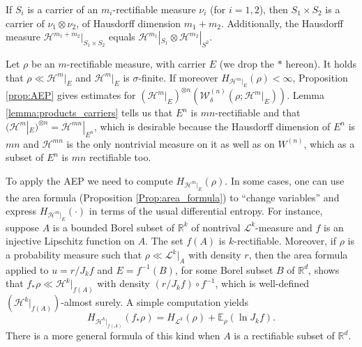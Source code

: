 \documentclass[runningheads]{llncs}
\newcommand{\Exx}[2]{\mathbb{E}_{#1}\left(#2\right)}
\newcommand{\Rr}{\mathbb{R}}
\begin{document}
\begin{lemma}\label{lemma:products_carriers}
If $S_i$ is a carrier of an $m_i$-rectifiable measure $\nu_i$ (for $i=1,2$), then $S_1\times S_2$ is  a carrier of $\nu_1\otimes\nu_2$, of Hausdorff dimension $m_1+m_2$. 
Additionally, the Hausdorff measure $\mathcal H^{m_1+m_2}|_{S_1\times S_2}$ equals $\mathcal H^{m_1}|_{S_1} \otimes \mathcal H^{m_2}|_{S^2}$. 
\end{lemma}

Let $\rho$ be an $m$-rectifiable measure, with carrier $E$ (we drop the $*$ hereon). It holds that $\rho \ll\mathcal H^m|_{E}$ and $\mathcal H^m|_E$ is $\sigma$-finite. If moreover $H_{\mathcal H^m|_{E}}(\rho)<\infty$,  Proposition \ref{prop:AEP} gives estimates for  $(\mathcal H^{m}|_E)^{\otimes n}(\mathcal  W^{(n)}_\delta (\rho; \mathcal H^m|_{E}))$. Lemma \ref{lemma:products_carriers} tells us that $E^n$ is $mn$-rectifiable and that $(\mathcal H^{m}|_E)^{\otimes n} = \mathcal H^{mn}|_{E^n}$, which is desirable because the Hausdorff dimension of $E^n$ is $mn$ and $\mathcal H^{mn}$ is the only nontrivial measure on it as well as on $W^{(n)}$, which as a subset of $E^n$ is $mn$ rectifiable too.

To apply the AEP we need to compute $H_{\mathcal H^m|_{E}}(\rho)$. In some cases, one can use the area formula (Proposition \ref{Prop:area_formula}) to ``change variables'' and express $H_{\mathcal H^m|_{E}}(\cdot)$ in terms of the usual differential entropy. For instance, suppose $A$ is a bounded Borel subset of $\Rr^k$ of nontrival $\mathcal L^k$-measure and  $f$ is an injective Lipschitz function on $A$. The set   $f(A)$ is $k$-rectifiable. Moreover, if $\rho$ is a probability measure such that $\rho \ll \mathcal L^k|_{A}$ with density $r$, then the area formula  applied to $u=r/J_k f$ and $E=f^{-1} (B)$, for some Borel subset $B$ of $\Rr^d$, shows that $f_*\rho \ll \mathcal H^k|_{ f(A)}$ with density $(r/J_k f) \circ f^{-1}$, which is well-defined $(\mathcal H^k|_{ f(A)})$-almost surely. A simple computation yields
\begin{equation}
    H_{\mathcal H^k|_{f(A)}}(f_*\rho) = H_{\mathcal L^k}(\rho) + \Exx{\rho}{\ln J_k f}.
\end{equation}
There is a more general formula of this kind when $A$ is a rectifiable subset of $\Rr^d$.
\end{document}
